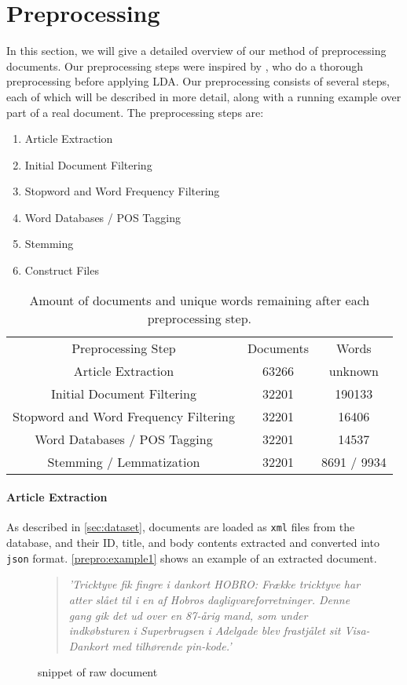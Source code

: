 \section{Preprocessing}\label{sec:prepro}

In this section, we will give a detailed overview of our method of preprocessing documents.
Our preprocessing steps were inspired by \cite{quanti}, who do a thorough preprocessing before applying LDA. 
Our preprocessing consists of several steps, each of which will be described in more detail, along with a running example over part of a real document.
The preprocessing steps are:
\begin{enumerate}[label=\alph*]
	\item Article Extraction
	\item Initial Document Filtering
	\item Stopword and Word Frequency Filtering
	\item Word Databases / POS Tagging
	\item Stemming
	\item Construct Files
\end{enumerate}

\begin{table}
	\begin{tabular}{c|c|c}
		Preprocessing Step & Documents & Words\\
		Article Extraction & 63266 & unknown \\ 
		Initial Document Filtering & 32201 & 190133 \\ 
		Stopword and Word Frequency Filtering & 32201 & 16406 \\
		Word Databases / POS Tagging & 32201 & 14537 \\
		Stemming / Lemmatization & 32201 & 8691 / 9934\\
	\end{tabular}
	\label{tab:prepro_doc_word}
	\caption{Amount of documents and unique words remaining after each preprocessing step.}
\end{table}

\paragraph{Article Extraction}
As described in \autoref{sec:dataset}, documents are loaded as \texttt{xml} files from the database, and their ID, title, and body contents extracted and converted into \texttt{json} format.
\autoref{prepro:example1} shows an example of an extracted document.
\begin{figure}[h]
	\begin{quote}
		\textit{
			'Tricktyve fik fingre i dankort HOBRO: Frække tricktyve har atter slået til i en af Hobros dagligvareforretninger. Denne gang gik det ud over en 87-årig mand, som under indkøbsturen i Superbrugsen i Adelgade blev frastjålet sit Visa-Dankort med tilhørende pin-kode.'
		}
	\end{quote}
	\caption{snippet of raw document}
	\label{prepro:example1}
\end{figure}


